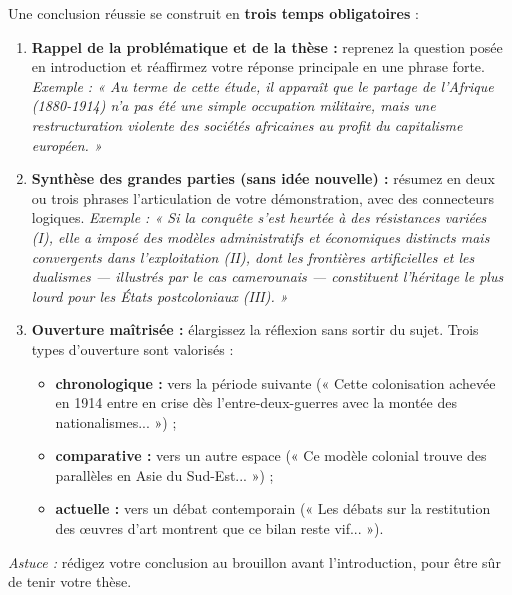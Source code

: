 \documentclass[11pt]{article}
\begin{document}
\begin{methode}
Une conclusion réussie se construit en \textbf{trois temps obligatoires} :
\begin{enumerate}
\item \textbf{Rappel de la problématique et de la thèse :} reprenez la question posée en introduction et réaffirmez votre réponse principale en une phrase forte. \emph{Exemple : « Au terme de cette étude, il apparaît que le partage de l'Afrique (1880-1914) n'a pas été une simple occupation militaire, mais une restructuration violente des sociétés africaines au profit du capitalisme européen. »}
\item \textbf{Synthèse des grandes parties (sans idée nouvelle) :} résumez en deux ou trois phrases l'articulation de votre démonstration, avec des connecteurs logiques. \emph{Exemple : « Si la conquête s'est heurtée à des résistances variées (I), elle a imposé des modèles administratifs et économiques distincts mais convergents dans l'exploitation (II), dont les frontières artificielles et les dualismes — illustrés par le cas camerounais — constituent l'héritage le plus lourd pour les États postcoloniaux (III). »}
\item \textbf{Ouverture maîtrisée :} élargissez la réflexion sans sortir du sujet. Trois types d'ouverture sont valorisés :
\begin{itemize}
\item \textbf{chronologique :} vers la période suivante (« Cette colonisation achevée en 1914 entre en crise dès l'entre-deux-guerres avec la montée des nationalismes... ») ;
\item \textbf{comparative :} vers un autre espace (« Ce modèle colonial trouve des parallèles en Asie du Sud-Est... ») ;
\item \textbf{actuelle :} vers un débat contemporain (« Les débats sur la restitution des œuvres d'art montrent que ce bilan reste vif... »).
\end{itemize}
\end{enumerate}
\emph{Astuce :} rédigez votre conclusion au brouillon avant l'introduction, pour être sûr de tenir votre thèse.
\end{methode}
\end{document}
